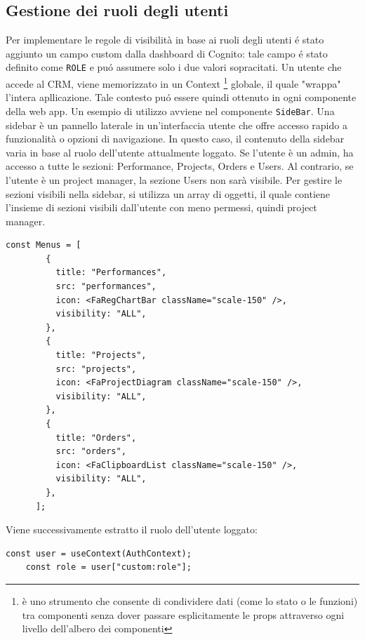 \documentclass[target=bach,aauheader=,style=]{thud}
\begin{document}
\subsection{Gestione dei ruoli degli utenti}
Per implementare le regole di visibilità in base ai ruoli degli utenti é stato aggiunto un campo custom dalla dashboard di Cognito: tale campo é stato definito come \texttt{ROLE} e puó assumere solo i due valori sopracitati. Un utente che accede al CRM, viene memorizzato in un Context \footnote{è uno strumento che consente di condividere dati (come lo stato o le funzioni) tra componenti senza dover passare esplicitamente le props attraverso ogni livello dell'albero dei componenti} globale, il quale "wrappa" l'intera apllicazione. Tale contesto puó essere quindi ottenuto in ogni componente della web app. Un esempio di utilizzo avviene nel componente \texttt{SideBar}. Una sidebar è un pannello laterale in un'interfaccia utente che offre accesso rapido a funzionalità o opzioni di navigazione. In questo caso, il contenuto della sidebar varia in base al ruolo dell'utente attualmente loggato. Se l'utente è un admin, ha accesso a tutte le sezioni: Performance, Projects, Orders e Users. Al contrario, se l'utente è un project manager, la sezione Users non sarà visibile. Per gestire le sezioni visibili nella sidebar, si utilizza un array di oggetti, il quale contiene l'insieme di sezioni visibili dall'utente con meno permessi, quindi project manager. 

\begin{lstlisting}[caption=Campi default visibili nella sidebar]
    const Menus = [
        {
          title: "Performances",
          src: "performances",
          icon: <FaRegChartBar className="scale-150" />,
          visibility: "ALL",
        },
        {
          title: "Projects",
          src: "projects",
          icon: <FaProjectDiagram className="scale-150" />,
          visibility: "ALL",
        },
        {
          title: "Orders",
          src: "orders",
          icon: <FaClipboardList className="scale-150" />,
          visibility: "ALL",
        },
      ];
\end{lstlisting}

Viene successivamente estratto il ruolo dell'utente loggato:

\begin{lstlisting}[caption=Parte del file \texttt{AuthenticatedLayout.tsx} del CRM]
    const user = useContext(AuthContext);
    const role = user["custom:role"];
\end{lstlisting}
\end{document}

